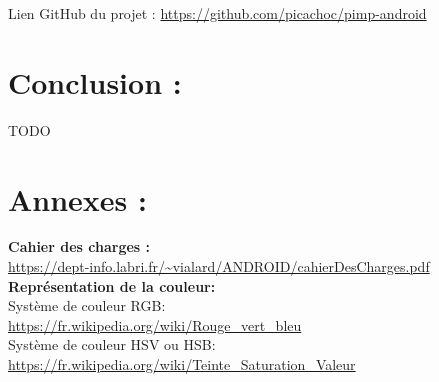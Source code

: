 \documentclass[12pt, a4paper]{article}
\begin{document}
\vspace{1cm}
\faArrowRight Lien GitHub du projet :
\href{https://github.com/picachoc/pimp-android}{https://github.com/picachoc/pimp-android}
\vspace{1cm}

\clearpage


\clearpage


\clearpage


\clearpage


\clearpage


\clearpage


\clearpage

\section{Conclusion :}
TODO



\section{Annexes :}

\textbf{Cahier des charges :}
\\
\url{https://dept-info.labri.fr/~vialard/ANDROID/cahierDesCharges.pdf}
\\

\textbf{Représentation de la couleur:}
\\
Système de couleur RGB:
\\
\url{https://fr.wikipedia.org/wiki/Rouge_vert_bleu}
\\
Système de couleur HSV ou HSB:
\\
\url{https://fr.wikipedia.org/wiki/Teinte_Saturation_Valeur}
\\
\end{document}
